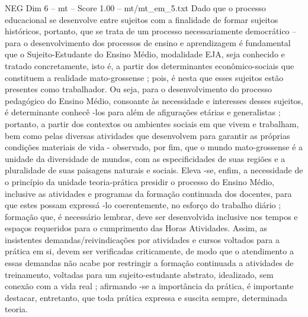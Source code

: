 \begin{textsample}{NEG Dim 6 – mt – Score 1.00 – mt/mt\_em\_5.txt}
Dado que o processo educacional se desenvolve entre sujeitos com a finalidade de formar sujeitos históricos, portanto, que se trata de um processo necessariamente democrático – para o desenvolvimento dos processos de ensino e aprendizagem é fundamental que o Sujeito-Estudante do Ensino Médio, modalidade EJA, seja conhecido e tratado concretamente, isto é, a partir dos determinantes econômico-sociais que constituem a realidade mato-grossense ; pois, é nesta que esses sujeitos estão presentes como trabalhador.
Ou seja, para o desenvolvimento do processo pedagógico do Ensino Médio, consoante às necessidade e interesses desses sujeitos, é determinante conhecê -los para além de afigurações etárias e generalistas ; portanto, a partir dos contextos ou ambientes sociais em que vivem e trabalham, bem como pelas diversas atividades que desenvolvem para garantir as próprias condições materiais de vida - observado, por fim, que o mundo mato-grossense é a unidade da diversidade de mundos, com as especificidades de suas regiões e a pluralidade de suas paisagens naturais e sociais.
Eleva -se, enfim, a necessidade de o princípio da unidade teoria-prática presidir o processo do Ensino Médio, inclusive as atividades e programas da formação continuada dos docentes, para que estes possam expressá -lo coerentemente, no esforço do trabalho diário ; formação que, é necessário lembrar, deve ser desenvolvida inclusive nos tempos e espaços requeridos para o cumprimento das Horas Atividades.
Assim, as insistentes demandas/reivindicações por atividades e cursos voltados para a prática em si, devem ser verificadas criticamente, de modo que o atendimento a essas demandas não acabe por restringir a formação continuada a atividades de treinamento, voltadas para um sujeito-estudante abstrato, idealizado, sem conexão com a vida real ; afirmando -se a importância da prática, é importante destacar, entretanto, que toda prática expressa e suscita sempre, determinada teoria.

\end{textsample}
